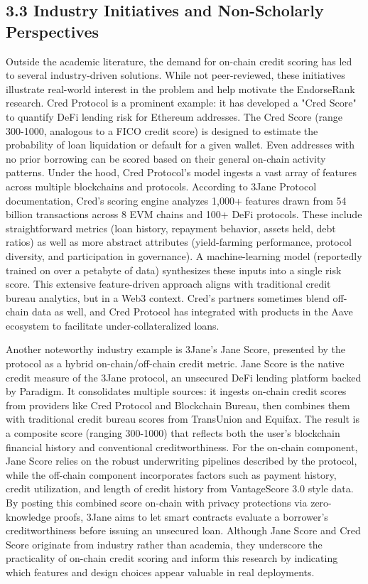 \subsection*{3.3 Industry Initiatives and Non-Scholarly Perspectives}
\label{sec:industry-initiatives-and-non-scholarly-perspectives}

Outside the academic literature, the demand for on-chain credit scoring has led to several industry-driven solutions. While not peer-reviewed, these initiatives illustrate real-world interest in the problem and help motivate the EndorseRank research. Cred Protocol is a prominent example: it has developed a "Cred Score" to quantify DeFi lending risk for Ethereum addresses. The Cred Score (range 300-1000, analogous to a FICO credit score) is designed to estimate the probability of loan liquidation or default for a given wallet. Even addresses with no prior borrowing can be scored based on their general on-chain activity patterns. Under the hood, Cred Protocol's model ingests a vast array of features across multiple blockchains and protocols. According to 3Jane Protocol documentation, Cred's scoring engine analyzes 1,000+ features drawn from 54 billion transactions across 8 EVM chains and 100+ DeFi protocols. These include straightforward metrics (loan history, repayment behavior, assets held, debt ratios) as well as more abstract attributes (yield-farming performance, protocol diversity, and participation in governance). A machine-learning model (reportedly trained on over a petabyte of data) synthesizes these inputs into a single risk score. This extensive feature-driven approach aligns with traditional credit bureau analytics, but in a Web3 context. Cred's partners sometimes blend off-chain data as well, and Cred Protocol has integrated with products in the Aave ecosystem to facilitate under-collateralized loans.


Another noteworthy industry example is 3Jane's Jane Score, presented by the protocol as a hybrid on-chain/off-chain credit metric. Jane Score is the native credit measure of the 3Jane protocol, an unsecured DeFi lending platform backed by Paradigm. It consolidates multiple sources: it ingests on-chain credit scores from providers like Cred Protocol and Blockchain Bureau, then combines them with traditional credit bureau scores from TransUnion and Equifax. The result is a composite score (ranging 300-1000) that reflects both the user's blockchain financial history and conventional creditworthiness. For the on-chain component, Jane Score relies on the robust underwriting pipelines described by the protocol, while the off-chain component incorporates factors such as payment history, credit utilization, and length of credit history from VantageScore 3.0 style data. By posting this combined score on-chain with privacy protections via zero-knowledge proofs, 3Jane aims to let smart contracts evaluate a borrower's creditworthiness before issuing an unsecured loan. Although Jane Score and Cred Score originate from industry rather than academia, they underscore the practicality of on-chain credit scoring and inform this research by indicating which features and design choices appear valuable in real deployments.


